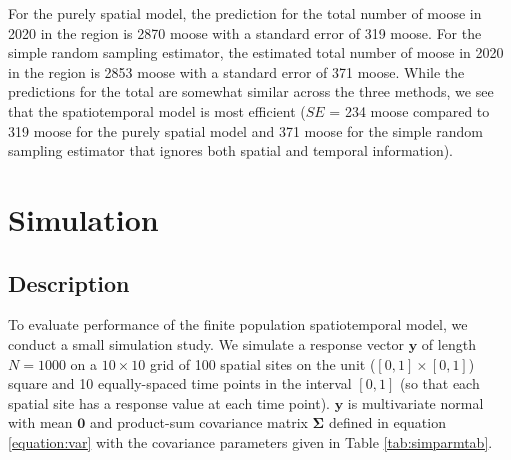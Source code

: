 \documentclass[]{interact}
\theoremstyle{plain}%
\theoremstyle{definition}
\theoremstyle{remark}
\begin{document}
For the purely spatial model, the prediction for the total number of
moose in 2020 in the region is 2870 moose with a standard error of 319
moose. For the simple random sampling estimator, the estimated total
number of moose in 2020 in the region is 2853 moose with a standard
error of 371 moose. While the predictions for the total are somewhat
similar across the three methods, we see that the spatiotemporal model
is most efficient (\(SE\) = 234 moose compared to 319 moose for the
purely spatial model and 371 moose for the simple random sampling
estimator that ignores both spatial and temporal information).

\section{Simulation} \label{section:Simulation}

\subsection{Description}

To evaluate performance of the finite population spatiotemporal model,
we conduct a small simulation study. We simulate a response vector
\(\mathbf{y}\) of length \(N = 1000\) on a \(10 \times 10\) grid of 100
spatial sites on the unit (\([0, 1] \times [0, 1]\)) square and 10
equally-spaced time points in the interval \([0, 1]\) (so that each
spatial site has a response value at each time point). \(\mathbf{y}\) is
multivariate normal with mean \(\mathbf{0}\) and product-sum covariance
matrix \(\bm{\Sigma}\) defined in equation \ref{equation:var} with the
covariance parameters given in Table \ref{tab:simparmtab}.
\end{document}
